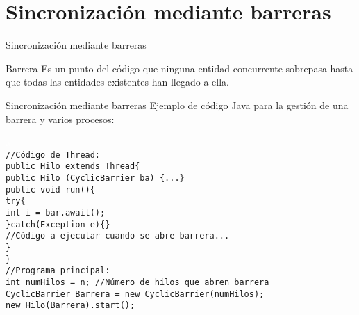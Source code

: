 \documentclass{beamer}
\begin{document}
\section{Sincronización mediante barreras}
\begin{frame}{Sincronización mediante barreras}
	\begin{block}{Barrera}
		Es un punto del código que ninguna entidad concurrente sobrepasa hasta que todas las entidades existentes han llegado a ella.
	\end{block}
\end{frame}

\begin{frame}{Sincronización mediante barreras}
Ejemplo de código Java para la gestión de una barrera y varios procesos:

\textcolor{white}{a\\}
	\texttt{//Código de Thread:\\
		public Hilo extends Thread\{\\
			\hspace{0.8cm}public Hilo (CyclicBarrier ba) \{...\}\\
			\hspace{0.8cm}public void run()\{\\
\hspace{0.8cm}\hspace{0.8cm}try\{\\
\hspace{0.8cm}\hspace{0.8cm}\hspace{0.8cm}int i = bar.await();\\
\hspace{0.8cm}\hspace{0.8cm}\}catch(Exception e)\{\}\\
\hspace{0.8cm}\hspace{0.8cm}//Código a ejecutar cuando se abre barrera...\\
\hspace{0.8cm}\}\\
		\}\\
	//Programa principal:\\
	int numHilos = n; //Número de hilos que abren barrera\\
	CyclicBarrier Barrera = new CyclicBarrier(numHilos);\\
	new Hilo(Barrera).start();}
\end{frame}
\end{document}
